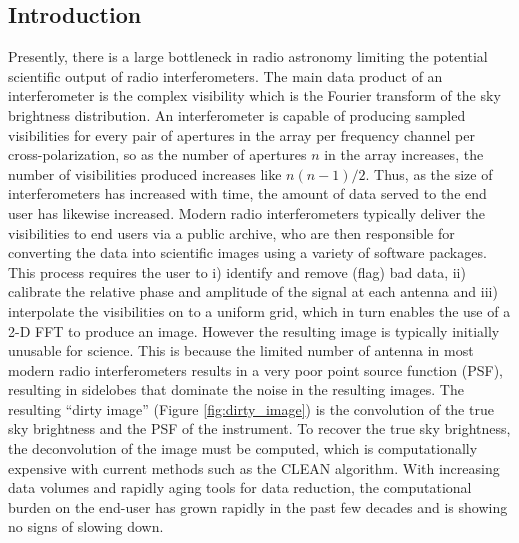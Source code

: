 \documentclass{article}
\begin{document}
\begin{multicols*}{2}

\section{Introduction}

Presently, there is a large bottleneck in radio astronomy limiting the potential scientific output of radio interferometers. The main data product of an interferometer is the complex visibility which is the Fourier transform of the sky brightness distribution. An interferometer is capable of producing sampled visibilities for every pair of apertures in the array per frequency channel per cross-polarization, so as the number of apertures $n$ in the array increases, the number of visibilities produced increases like $n(n-1)/2$. Thus, as the size of interferometers has increased with time, the amount of data served to the end user has likewise increased. Modern radio interferometers typically deliver the visibilities to end users via a public archive, who are then responsible for converting the data into scientific images using a variety of software packages. This process requires the user to i) identify and remove (flag) bad data, ii) calibrate the relative phase and amplitude of the signal at each antenna and iii) interpolate the visibilities on to a uniform grid, which in turn enables the use of a 2-D FFT to produce an image. \cite{dsa2000} However the resulting image is typically initially unusable for science. This is because the limited number of antenna in most modern radio interferometers results in a very poor point source function (PSF), resulting in sidelobes that dominate the noise in the resulting images. The resulting ``dirty image'' (Figure \ref{fig:dirty_image}) is the convolution of the true sky brightness and the PSF of the instrument. To recover the true sky brightness, the deconvolution of the image must be computed, which is computationally expensive with current methods such as the CLEAN\cite{Hgbom1974APERTURESW} algorithm. With increasing data volumes and rapidly aging tools for data reduction, the computational burden on the end-user has grown rapidly in the past few decades and is showing no signs of slowing down.



\end{multicols*}
\end{document}
